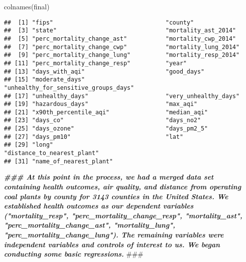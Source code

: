 \documentclass[
]{article}
\newenvironment{Shaded}{\begin{snugshade}}{\end{snugshade}}
\newcommand{\AlertTok}[1]{\textcolor[rgb]{0.94,0.16,0.16}{#1}}
\newcommand{\DocumentationTok}[1]{\textcolor[rgb]{0.56,0.35,0.01}{\textbf{\textit{#1}}}}
\newcommand{\FunctionTok}[1]{\textcolor[rgb]{0.00,0.00,0.00}{#1}}
\newcommand{\NormalTok}[1]{#1}
\begin{document}
\begin{Shaded}
\begin{Highlighting}[]
\FunctionTok{colnames}\NormalTok{(final)}
\end{Highlighting}
\end{Shaded}

\begin{verbatim}
##  [1] "fips"                                "county"                             
##  [3] "state"                               "mortality_ast_2014"                 
##  [5] "perc_mortality_change_ast"           "mortality_cwp_2014"                 
##  [7] "perc_mortality_change_cwp"           "mortality_lung_2014"                
##  [9] "perc_mortality_change_lung"          "mortality_resp_2014"                
## [11] "perc_mortality_change_resp"          "year"                               
## [13] "days_with_aqi"                       "good_days"                          
## [15] "moderate_days"                       "unhealthy_for_sensitive_groups_days"
## [17] "unhealthy_days"                      "very_unhealthy_days"                
## [19] "hazardous_days"                      "max_aqi"                            
## [21] "x90th_percentile_aqi"                "median_aqi"                         
## [23] "days_co"                             "days_no2"                           
## [25] "days_ozone"                          "days_pm2_5"                         
## [27] "days_pm10"                           "lat"                                
## [29] "long"                                "distance_to_nearest_plant"          
## [31] "name_of_nearest_plant"
\end{verbatim}

\begin{Shaded}
\begin{Highlighting}[]
\DocumentationTok{\#\#\# At this point in the process, we had a merged data set containing health outcomes, air quality, and distance from operating coal plants by county for 3143 counties in the United States. We established health outcomes as our dependent variables ("mortality\_resp", "perc\_mortality\_change\_resp", "mortality\_ast", "perc\_mortality\_change\_ast", "mortality\_lung", "perc\_mortality\_change\_lung"). The remaining variables were independent variables and controls of interest to us. We began conducting some basic regressions. }\AlertTok{\#\#\#}
\end{Highlighting}
\end{Shaded}
\end{document}
